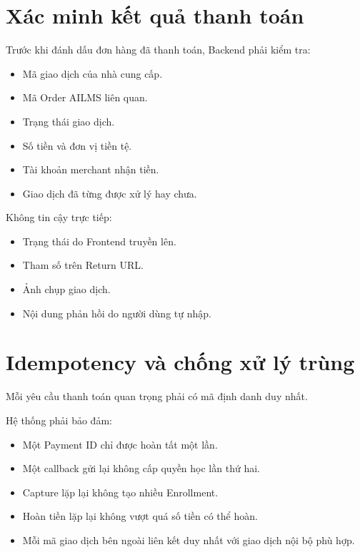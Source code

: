 \documentclass[12pt,a4paper]{article}
\begin{document}
\section{Xác minh kết quả thanh toán}

Trước khi đánh dấu đơn hàng đã thanh toán, Backend phải kiểm tra:

\begin{itemize}
    \item Mã giao dịch của nhà cung cấp.
    \item Mã Order AILMS liên quan.
    \item Trạng thái giao dịch.
    \item Số tiền và đơn vị tiền tệ.
    \item Tài khoản merchant nhận tiền.
    \item Giao dịch đã từng được xử lý hay chưa.
\end{itemize}

Không tin cậy trực tiếp:

\begin{itemize}
    \item Trạng thái do Frontend truyền lên.
    \item Tham số trên Return URL.
    \item Ảnh chụp giao dịch.
    \item Nội dung phản hồi do người dùng tự nhập.
\end{itemize}

\section{Idempotency và chống xử lý trùng}

Mỗi yêu cầu thanh toán quan trọng phải có mã định danh duy nhất.

Hệ thống phải bảo đảm:

\begin{itemize}
    \item Một Payment ID chỉ được hoàn tất một lần.
    \item Một callback gửi lại không cấp quyền học lần thứ hai.
    \item Capture lặp lại không tạo nhiều Enrollment.
    \item Hoàn tiền lặp lại không vượt quá số tiền có thể hoàn.
    \item Mỗi mã giao dịch bên ngoài liên kết duy nhất với giao dịch nội bộ phù hợp.
\end{itemize}
\end{document}
